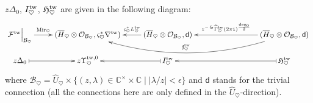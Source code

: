 \documentclass[11pt]{amsart}
\theoremstyle{definition} %
\theoremstyle{remark} %
\newcommand{\CC}{\mathbb C}
\newcommand{\tw}{{\rm tw}}
\newcommand{\cO}{\mathcal{O}}
\newcommand{\cF}{\mathcal{F}}
\newcommand{\cB}{\mathcal{B}}
\newcommand{\frf}{\mathfrak{f}}
\newcommand{\dd}{\mathsf{d}}
\newcommand{\grading}{\operatorname{\mathsf{Gr}}} %
\newcommand{\Mir}{\operatorname{Mir}}
\newcommand{\hGamma}{\widehat{\Gamma}}
\newcommand{\hU}{\widehat{U}}
\newcommand{\ov}{\overline}
\newcommand{\iu}{\mathtt{i}}
\newcommand{\Hf}{{\mathfrak{H}}}
\begin{document}
$z \Delta_0$, $I^\tw_{\heartsuit}$, $\Hf^\tw_{\heartsuit}$ 
are given 
in the following diagram: 
\begin{align*} 
\xymatrix@R=1pc{
\cF^\tw \Bigr|_{\cB_\heartsuit} \ar[r]^-{\Mir_\heartsuit} & 
(\ov{H}_{\heartsuit}\otimes \cO_{\cB_\heartsuit},\varsigma_{\heartsuit}^*\nabla^\tw) 
& \ar[l]_-{\varsigma_\heartsuit^* L^\tw_{\heartsuit}}
 (\ov{H}_{\heartsuit}\otimes \cO_{\cB_\heartsuit},\dd)  
& & & 
\ar@/^2pc/[llll]_{\frf^\tw_\heartsuit} 
\ar[lll]_-{z^{-\grading}\hGamma^\tw_\heartsuit
(2\pi\iu)^{\frac{\deg_0}{2}}}   
(\ov{H}_\heartsuit \otimes \cO_{\cB_\heartsuit},\dd)  \\ 
z \Delta_0 \ar@{|->}[r] &  z \Upsilon^{\tw,0}_\heartsuit &  
\ar@{|->}[l] I^\tw_{\heartsuit} & & & 
\ar@{|->}[lll]\Hf^\tw_\heartsuit 
}
\end{align*} 
where $\cB_\heartsuit = \hU_\heartsuit \times \{(z,\lambda) 
\in \CC^\times \times \CC \mid |\lambda/z| <\epsilon\}$ 
and $\dd$ stands for the trivial connection 
(all the connections here are only defined in 
the $\hU_\heartsuit$-direction). 
\end{document}
